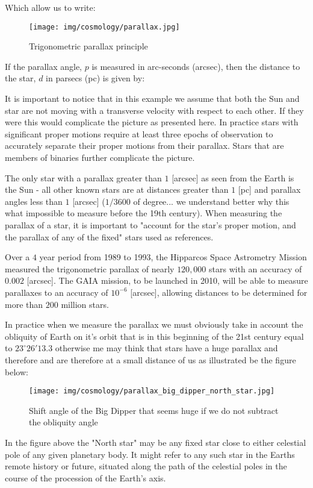 	Which allow us to write:
	
	\begin{figure}[H]
		\centering
		\texttt{[image: img/cosmology/parallax.jpg]}
		\caption{Trigonometric parallax principle}
	\end{figure}
	If the parallax angle, $p$ is measured in arc-seconds (arcsec), then the distance to the star, $d$ in parsecs (pc) is given by:
	
	It is important to notice that in this example we assume that both the Sun and star are not moving with a transverse velocity with respect to each other. If they were this would complicate the picture as presented here. In practice stars with significant proper motions require at least three epochs of observation to accurately separate their proper motions from their parallax. Stars that are members of binaries further complicate the picture.

	The only star with a parallax greater than $1$ [arcsec] as seen from the Earth is the Sun - all other known stars are at distances greater than $1$ [pc] and parallax angles less than $1$ [arcsec] ($1/3600$ of degree... we understand better why this what impossible to measure before the 19th century). When measuring the parallax of a star, it is important to "account for the star's proper motion, and the parallax of any of the fixed" stars used as references.

	Over a $4$ year period from 1989 to 1993, the Hipparcos Space Astrometry Mission measured the trigonometric parallax of nearly $120,000$ stars with an accuracy of $0.002$ [arcsec]. The GAIA mission, to be launched in 2010, will be able to measure parallaxes to an accuracy of $10^{-6}$ [arcsec], allowing distances to be determined for more than $200$ million stars.
	
	In practice when we measure the parallax we must obviously take in account the obliquity of Earth on it's orbit that is in this beginning of the 21st century equal to $23^\circ 26'13.3$ otherwise me may think that stars have a huge parallax and therefore and are therefore at a small distance of us as illustrated be the figure below:
	\begin{figure}[H]
		\centering
		\texttt{[image: img/cosmology/parallax\_big\_dipper\_north\_star.jpg]}
		\caption[]{Shift angle of the Big Dipper that seems huge if we do not subtract the obliquity angle}
	\end{figure}
	In the figure above the "North star" may be any fixed star close to either celestial pole of any given planetary body. It might refer to any such star in the Earths remote history or future, situated along the path of the celestial poles in the course of the procession of the Earth's axis.
	
